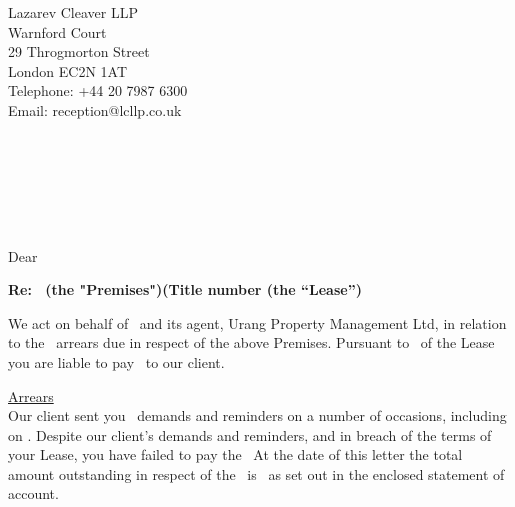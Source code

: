 \documentclass{article}
\begin{document}
\hspace*{\fill} Lazarev Cleaver LLP\\
\hspace*{\fill}Warnford Court\\
\hspace*{\fill}29 Throgmorton Street\\
\hspace*{\fill}London EC2N 1AT\\
\hspace*{\fill}Telephone: +44 20 7987 6300\\
\hspace*{\fill}Email: reception@lcllp.co.uk\par

\\
\secondperson\\
\street\\
\locality\\
\town\\
\postcode\par
\vspace{5 mm}
\par
\vspace{3 mm}
\noindent\textbf{\sendmethod}\par
\vspace{3 mm}
\noindent Dear \borrower\par
\vspace{3 mm}
\noindent\textbf{Re: \property\ (the "Premises")\pone (Title number \tnumber (the “Lease”)}
\vspace{3 mm}
\par
\noindent We act on behalf of \propowner\ and its agent, Urang Property Management Ltd, in relation to the \charges\ arrears due in respect of the above Premises. Pursuant to \clause\ of the Lease you are
liable to pay \charges\ to our client.
\vspace{3 mm}
\par
\noindent\underline{Arrears}\\
Our client sent you \charges\ demands and reminders on a number of occasions, including on \demanddate. Despite our client’s demands and reminders, and in breach of the terms of your Lease, you have failed to pay the \charges\ At the date of this letter the total amount outstanding in respect of the \charges\ is \total\ as set out in the enclosed statement of account.
\vspace{3 mm}
\par
\interest
\newpage
\costs
\end{document}
